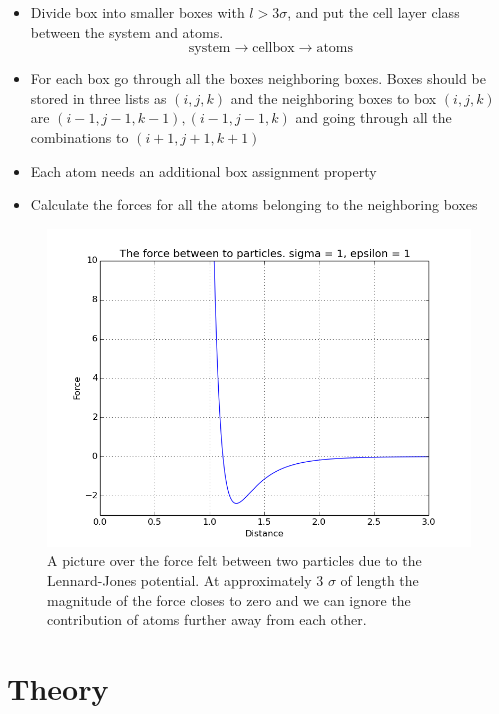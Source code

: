 \documentclass[11pt]{article}
\begin{document}
	\begin{itemize}
		\item Divide box into smaller boxes with \(l >3\sigma\), and put the cell layer class between the system and atoms.
				\[\text{system} \rightarrow\text{cellbox} \rightarrow \text{atoms}\]
		\item For each box go through all the boxes neighboring boxes. Boxes should be stored in three lists as \((i,j,k)\) and the neighboring boxes to box \((i,j,k)\) are \( (i-1, j-1, k-1), (i-1,j-1,k) \) and going through all the combinations to \( (i+1,j+1,k+1) \)
		\item Each atom needs an additional box assignment property
		\item Calculate the forces for all the atoms belonging to the neighboring boxes
	\end{itemize}

	



	\begin{figure}
		\includegraphics[scale = 0.5]{forcePlot}
		\caption{A picture over the force felt between two particles due to the Lennard-Jones potential. At approximately 3 \(\sigma\) of length the magnitude of the force closes to zero and we can ignore the contribution of atoms further away from each other.}
		\label{fig:force}
	\end{figure}



\section{Theory}
\end{document}

